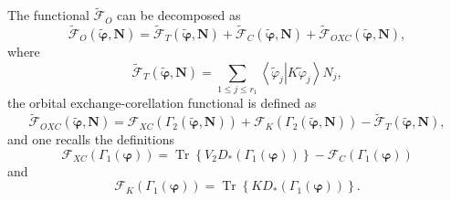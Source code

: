 \documentclass[aps,preprint]{revtex4}%
\begin{document}
The functional $\mathcal{\tilde{F}}_{O}$ can be decomposed as
\begin{equation}
\mathcal{\tilde{F}}_{O}\left(  \mathbf{\tilde{\varphi},N}\right)
=\mathcal{\tilde{F}}_{T}\left(  \mathbf{\tilde{\varphi},N}\right)
+\mathcal{\tilde{F}}_{C}\left(  \mathbf{\tilde{\varphi},N}\right)
+\mathcal{\tilde{F}}_{OXC}\left(  \mathbf{\tilde{\varphi},N}\right)  ,
\end{equation}
where
\begin{equation}
\mathcal{\tilde{F}}_{T}\left(  \mathbf{\tilde{\varphi},N}\right)  =\sum_{1\leq
j\leq r_{1}}\left\langle \tilde{\varphi}_{j}\left\vert K\tilde{\varphi}%
_{j}\right.  \right\rangle N_{j},
\end{equation}
the orbital exchange-corellation functional is defined as
\begin{equation}
\mathcal{\tilde{F}}_{OXC}\left(  \mathbf{\tilde{\varphi},N}\right)
=\mathcal{F}_{XC}\left(  \Gamma_{2}\left(  \mathbf{\tilde{\varphi},N}\right)
\right)  +\mathcal{F}_{K}\left(  \Gamma_{2}\left(  \mathbf{\tilde{\varphi}%
,N}\right)  \right)  -\mathcal{\tilde{F}}_{T}\left(  \mathbf{\tilde{\varphi
},N}\right)  ,
\end{equation}
and one recalls the definitions
\begin{equation}
\mathcal{F}_{XC}\left(  \Gamma_{1}\left(  \mathbf{\varphi}\right)  \right)
=\operatorname{Tr}\left\{  V_{2}D_{\ast}\left(  \Gamma_{1}\left(
\mathbf{\varphi}\right)  \right)  \right\}  -\mathcal{F}_{C}\left(  \Gamma
_{1}\left(  \mathbf{\varphi}\right)  \right)
\end{equation}
and
\begin{equation}
\mathcal{F}_{K}\left(  \Gamma_{1}\left(  \mathbf{\varphi}\right)  \right)
=\operatorname{Tr}\left\{  KD_{\ast}\left(  \Gamma_{1}\left(  \mathbf{\varphi
}\right)  \right)  \right\}  .
\end{equation}
\end{document}

